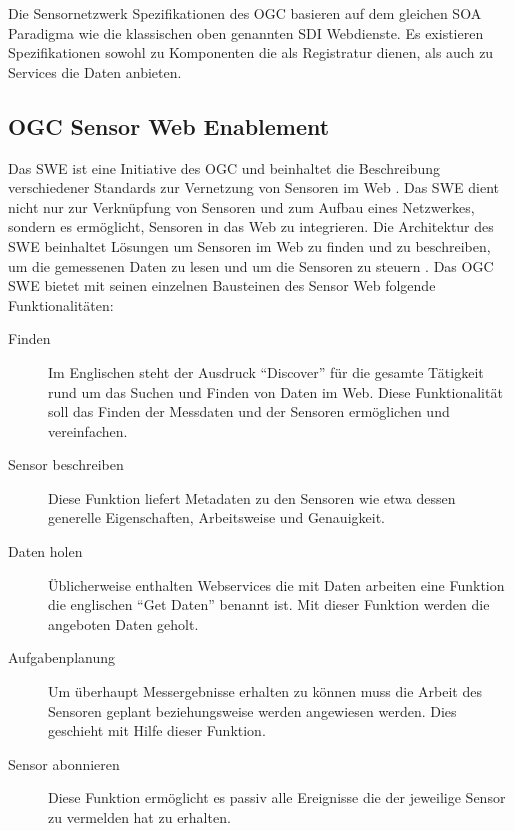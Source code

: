 Die Sensornetzwerk Spezifikationen des \gls{OGC} basieren auf dem gleichen \gls{SOA} Paradigma wie die klassischen oben genannten \gls{SDI} Webdienste. Es existieren Spezifikationen sowohl zu Komponenten die als Registratur dienen, als auch zu Services die Daten anbieten.


\subsection{OGC Sensor Web Enablement}
Das \gls{SWE} ist eine Initiative des \gls{OGC} und beinhaltet die Beschreibung verschiedener Standards zur Vernetzung von Sensoren im Web \citep{botts_ogc_2008}\citep{bermudez_ogc_2011}. Das \gls{SWE} dient nicht nur zur Verknüpfung von Sensoren und zum Aufbau eines Netzwerkes, sondern es ermöglicht, Sensoren in das Web zu integrieren. Die Architektur des \gls{SWE} beinhaltet Lösungen um Sensoren im Web zu finden und zu beschreiben, um die gemessenen Daten zu lesen und um die Sensoren zu steuern \citep{botts_ogc_2008}\citep{broring_new_2011}. Das \gls{OGC} \gls{SWE} bietet mit seinen einzelnen Bausteinen des Sensor Web folgende Funktionalitäten:

\begin{description}
\item[Finden] Im Englischen steht der Ausdruck ``Discover'' für die gesamte Tätigkeit rund um das Suchen und Finden von Daten im Web. Diese Funktionalität soll das Finden der Messdaten und der Sensoren ermöglichen und vereinfachen.
\item[Sensor beschreiben] Diese Funktion liefert Metadaten zu den Sensoren wie etwa dessen generelle Eigenschaften, Arbeitsweise und Genauigkeit.
\item[Daten holen] Üblicherweise enthalten Webservices die mit Daten arbeiten eine Funktion die englischen ``Get Daten'' benannt ist. Mit dieser Funktion werden die angeboten Daten geholt.
\item[Aufgabenplanung] Um überhaupt Messergebnisse erhalten zu können muss die Arbeit des Sensoren geplant beziehungsweise werden angewiesen werden. Dies geschieht mit Hilfe dieser Funktion.
\item[Sensor abonnieren] Diese Funktion ermöglicht es passiv alle Ereignisse die der jeweilige Sensor zu vermelden hat zu erhalten.
\end{description}

\citep{botts_ogc_2008}\citep{broring_new_2011}

